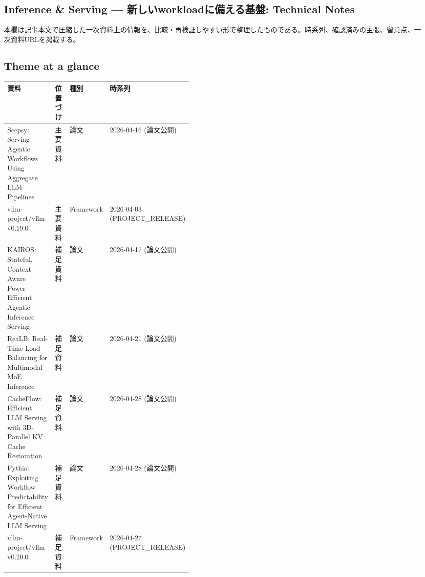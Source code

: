 \subsection*{Inference \& Serving — 新しいworkloadに備える基盤: Technical Notes}
本欄は記事本文で圧縮した一次資料上の情報を、比較・再検証しやすい形で整理したものである。時系列、確認済みの主張、留意点、一次資料URLを掲載する。
\medskip
\subsection*{Theme at a glance}
\begin{center}
\footnotesize
\begin{tabularx}{\linewidth}{@{}p{0.20\linewidth}p{0.10\linewidth}p{0.14\linewidth}X@{}}
\toprule
資料 & 位置づけ & 種別 & 時系列 \\
\midrule
Scepsy: Serving Agentic Workflows Using Aggregate LLM Pipelines & 主要資料 & 論文 & 2026-04-16 (論文公開) \\
vllm-project/vllm v0.19.0 & 主要資料 & Framework & 2026-04-03 (PROJECT\_RELEASE) \\
KAIROS: Stateful, Context-Aware Power-Efficient Agentic Inference Serving & 補足資料 & 論文 & 2026-04-17 (論文公開) \\
ReaLB: Real-Time Load Balancing for Multimodal MoE Inference & 補足資料 & 論文 & 2026-04-21 (論文公開) \\
CacheFlow: Efficient LLM Serving with 3D-Parallel KV Cache Restoration & 補足資料 & 論文 & 2026-04-28 (論文公開) \\
Pythia: Exploiting Workflow Predictability for Efficient Agent-Native LLM Serving & 補足資料 & 論文 & 2026-04-28 (論文公開) \\
vllm-project/vllm v0.20.0 & 補足資料 & Framework & 2026-04-27 (PROJECT\_RELEASE) \\
\bottomrule
\end{tabularx}
\end{center}
\normalsize

